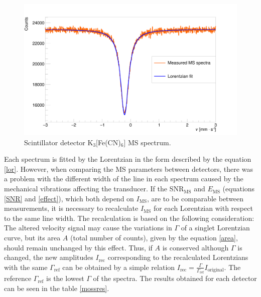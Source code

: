 \begin{figure}[H]
\centering
\includegraphics[scale=0.125, angle = 0]{./pictures/MossPMT.png}
\caption{Scintillator detector K$_{3}[$Fe(CN)$_{6}]$ MS spectrum.}
\label{Scintillator detector MS spectra.}

\end{figure}
Each spectrum is fitted by the Lorentzian in the form described by the equation \ref{lor}. However, when comparing the MS parameters between detectors, there was a problem with the different width of the line in each spectrum caused by the mechanical vibrations affecting the transducer. If the SNR$_{\textrm{MS}}$ and $E_{\textrm{MS}}$ (equations \ref{SNR} and \ref{effect}), which both depend on $I_{\textrm{MS}}$, are to be comparable between measurements, it is necessary to recalculate $I_{\textrm{MS}}$ for each Lorentzian with respect to the same line width. The recalculation is based on the following consideration: The altered velocity signal may cause the variations in $\Gamma$ of a singlet Lorentzian curve, but its area $A$ (total number of counts), given by the equation \ref{area}, should remain unchanged by this effect. Thus, if $A$ is conserved although $\Gamma$ is changed, the new amplitudes $I_{\textrm{rec}}$ corresponding to the recalculated Lorentzians with the same $\Gamma_{\textrm{ref}}$ can be obtained by a simple relation $I_{\textrm{rec}} = \frac{\Gamma}{\Gamma_{\textrm{ref}}}I_{\textrm{original}}$. The reference $\Gamma_{\textrm{ref}}$ is the lowest $\Gamma$ of the spectra.
The results obtained for each detector can be seen in the table \ref{mossres}.

